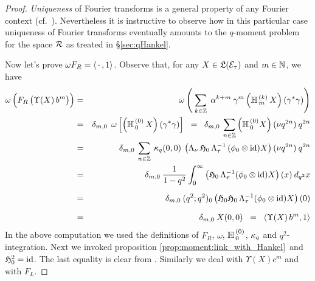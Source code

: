 \begin{proof}
{\em Uniqueness\/} of Fourier transforms is a general property of
any Fourier context (cf.\ \mbox{\cite[lemma 2.2.5]{Jeroen:QE2:haar}}).
Nevertheless it is instructive to observe how in this particular case
uniqueness of Fourier transforms eventually amounts to the $q$-moment
problem for the space $\mathcal R$ as treated in \S\ref{sec:qHankel}\@.

Now let's prove $\omega F_R = \langle \,\cdot\,,1 \rangle$.
Observe that, for any $X\in \mathfrak{L}(\mathcal E_\tau)$ and $m\in \mathbb{N}$, we have
\begin{eqnarray*}
    \omega\left(\vertL F_R \left(\vertM\Upsilon(X)\, b^m\right) \right)
&=& \omega\left(\: \sum_{k\in\ZZ} \; \alpha^{k+m} \: \gamma^m
    \left(\YaH{m}{k}\,X\right)(\gamma^*\gamma) \right)  \\
&=& \delta_{m,0} \; \, \omega \left[
            \left(\YaH{0}{0}\,X\right)(\gamma^*\gamma) \right]
\;\;=\;\;
     \delta_{m,0}\: \sum_{n \in\ZZ} \left(\YaH{0}{0} X \right) (\nu q^{2n})\: q^{2n}  \\
&=& \delta_{m,0}\: \sum_{n\in\ZZ} \: \kq(0,0) \: \left( \Lambda_\nu \, \holH{0}
          \, \Lambda_\tau^{-1}\,(\evzero \tens \id) X \right) (\nu q^{2n})\: q^{2n} \\
&=& \delta_{m,0}\: \frac{1}{1-q^2} \int_0^\infty  \left(\holH{0} \, \Lambda_\tau^{-1}
                 (\evzero \tens \id) X \right)(x) \: d_{q^2}x  \\
&=& \vertXL \delta_{m,0}\: (q^2;q^2)_0  \left(\holH{0}\holH{0} \, \Lambda_\tau^{-1}
                 (\evzero \tens \id) X\right)(0)  \\
&=& \vertXL \delta_{m,0}\: X(0,0)
\;\;=\;\; \pair{\Upsilon(X)\, b^m}{1}
\end{eqnarray*}
In the above computation we used the definitions of $F_R$,
$\omega$, $\mathbb{H}_{\,0}^{\,(0)}$, $\kappa_q$ and $q^2$-integration. Next we invoked
proposition \ref{prop:moment:link_with_Hankel}\ and $\mathfrak{H}_{0}^2 = \mbox{\rm id}$.
The last equality is clear from \cite[definition 3.2.3.1 and lemma 3.3.1.4]{Jeroen:QE2:haar}\@.
Similarly we deal with $\Upsilon(X) c^m$ and with $F_L$.


\end{proof}
